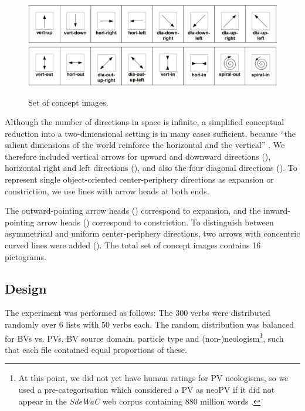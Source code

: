 \documentclass[output=paper]{langsci/langscibook}
\begin{document}
\begin{figure}
  \caption{Set of concept images.}
  \label{fig:CIdir}
  \hspace*{+1mm}\includegraphics[width=.95\linewidth]{figures/CIs-1-8.png}
  \vspace{+3mm}\\
  \includegraphics[width=.95\linewidth]{figures/CIs-9-16}
\end{figure}

Although the number of directions in space is infinite, a simplified
conceptual reduction into a two-dimensional setting is in many cases
sufficient, because ``the salient dimensions of the world reinforce
the horizontal and the vertical'' \citep{Tversky:11}. We therefore
included vertical arrows for upward and downward directions
(), horizontal right and left directions
(), and also the four diagonal
directions (). To represent single object-oriented center-periphery
directions as expansion or constriction, we use lines with arrow heads at
both ends.

The outward-pointing arrow heads
()
correspond to expansion, and the inward-pointing arrow heads
() correspond to constriction. To distinguish
between asymmetrical and uniform center-periphery directions, two
arrows with concentric curved lines were added (). The total set of concept images contains 16 pictograms.


\subsection{Design}
\label{sec:design}

The experiment was performed as follows: The 300 verbs were
distributed randomly over 6 lists with 50 verbs each. The random
distribution was balanced for BVs vs. PVs, BV source domain, particle
type and (non-)neologism\footnote{At this point, we did not yet have
  human ratings for PV neologisms, so we used a pre-categorisation
  which considered a PV as neoPV if it did not appear in the
  \textit{SdeWaC} web corpus containing 880 million words
  \citep{Faass/Eckart:13}.}, such that each file contained equal
proportions of these.
\end{document}
